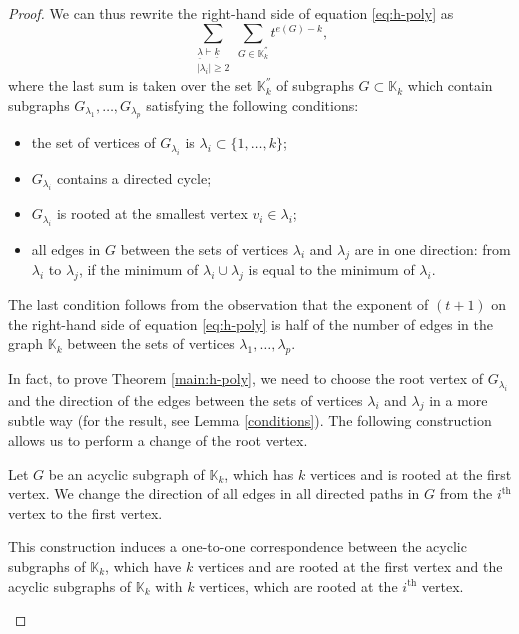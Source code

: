 \begin{proof}
We can thus rewrite the right-hand side of equation \eqref{eq:h-poly} as 
\begin{equation}\label{rhsof12}
\sum_{\substack{\underline{\lambda}\vdash\underline{k} \\  |\lambda_i|\geq 2}} \sum_{G\in\mathbb{K}^{''}_k}t^{e(G)-k},
\end{equation}
where the last sum is taken over the set $ \mathbb{K}^{''}_k $ of subgraphs $G\subset \mathbb{K}_k$ which contain subgraphs $G_{\lambda_1}, \ldots ,G_{\lambda_p}$ satisfying the following conditions: 
\begin{itemize}
\item the set of vertices of $G_{\lambda_i}$ is $\lambda_i\subset\{1, \ldots ,k\}$;
\item $G_{\lambda_i}$ contains a directed cycle;
\item $G_{\lambda_i}$ is rooted at the smallest vertex $v_i\in\lambda_i$;
\item all edges in $G$ between the sets of vertices $\lambda_i$ and $\lambda_j$ are in one direction: from $\lambda_i$ to $\lambda_j$, if the minimum of $\lambda_i\cup \lambda_j$ is equal to the minimum of $\lambda_i$.
\end{itemize} 
The last condition follows from the observation that  the exponent of $(t+1)$ on the right-hand side of equation \eqref{eq:h-poly} is half of the number of edges in the graph $\mathbb{K}_k$ between the sets of vertices $\lambda_1, \ldots ,\lambda_p$. 

In fact, to prove Theorem \ref{main:h-poly}, we need to choose the root vertex of $G_{\lambda_i}$ and the direction of the edges between the sets of vertices $\lambda_i$ and $\lambda_j$ in a more subtle way (for the result, see Lemma \ref{conditions}). 
The following construction allows us to perform a change of the root vertex. 

\begin{constr}[roots]
\label{construction:roots} Let $G$ be 
an acyclic subgraph of $\mathbb{K}_k$, which has $k$ vertices and is rooted at 
the first vertex. We change the direction of all edges in all directed paths in 
$G$ from the $i^{\mathrm{th}}$ vertex to the first vertex. 
\end{constr}

\begin{lemma}\label{redvertex}
This construction induces a one-to-one correspondence between the acyclic subgraphs of $\mathbb{K}_k$, which have $k$ vertices and are rooted at the first vertex and the acyclic subgraphs of $\mathbb{K}_k$  with $k$ vertices, which are rooted at the $i^{\mathrm{th}}$ vertex. 
\end{lemma}


\end{proof}
